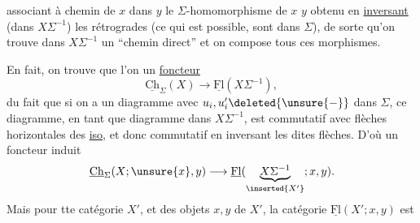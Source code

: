  associant à  chemin de $x$ dans $y$ le $\Sigma$-homomorphisme de $x$  $y$ obtenu en \uline{inversant}  (dans $X\Sigma^{-1}$) les   rétrogrades (ce qui est possible,  sont dans $\Sigma$), de sorte qu'on trouve dans $X\Sigma^{-1}$ un ``chemin direct''
et on compose tous ces morphismes.

En fait, on trouve  que  l'on   un \uline{foncteur}
\[
\underline{\mathrm{Ch}}_\Sigma(X)\longrightarrow\underline{\mathrm{Fl}}(X\Sigma^{-1}),
\]
du fait que si on a un diagramme
avec $u_i,u'_i\deleted{\unsure{-}}$ dans $\Sigma$, ce diagramme, en tant que diagramme dans $X\Sigma^{-1}$, est commutatif avec flèches horizontales des \uline{iso}, et  donc commutatif en inversant les dites flèches. D'où un foncteur induit
\[
\underline{\mathrm{Ch}}_\Sigma(X;\unsure{x},y)\longrightarrow\underline{\mathrm{Fl}}(\underset{\inserted{X'}}{\underbrace{X\Sigma^{-1}}};x,y).
\]
Mais  pour tte catégorie $X'$, et des objets $x,y$ de $X'$, la catégorie $\underline{\mathrm{Fl}}(X';x,y)$ est

